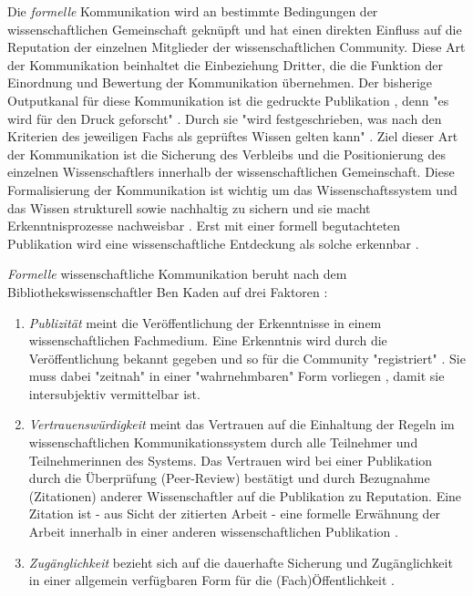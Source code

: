 Die \textit{formelle} Kommunikation wird an bestimmte Bedingungen der wissenschaftlichen Gemeinschaft geknüpft und hat einen direkten Einfluss auf die Reputation der einzelnen Mitglieder der wissenschaftlichen Community. Diese Art der Kommunikation beinhaltet die Einbeziehung Dritter, die die Funktion der Einordnung und Bewertung der Kommunikation übernehmen. Der bisherige Outputkanal für diese Kommunikation ist die gedruckte Publikation \cite{winkler_2011_anforderungen}, denn "es wird für den Druck geforscht" \cite{luhmann_1997_gesellschaft}. Durch sie "wird festgeschrieben, was nach den Kriterien des jeweiligen Fachs als geprüftes Wissen gelten kann" \cite{bbaw_publizieren_2015}. Ziel dieser Art der Kommunikation ist die Sicherung des Verbleibs und die Positionierung des einzelnen Wissenschaftlers innerhalb der wissenschaftlichen Gemeinschaft. Diese Formalisierung der Kommunikation ist wichtig um das Wissenschaftssystem und das Wissen strukturell sowie nachhaltig zu sichern und sie macht Erkenntnisprozesse nachweisbar \cite{kaden_2009_library}. Erst mit einer formell begutachteten Publikation wird eine wissenschaftliche Entdeckung als solche erkennbar \cite{brembs2015open}.

\textit{Formelle} wissenschaftliche Kommunikation beruht nach dem Bibliothekswissenschaftler Ben Kaden auf drei Faktoren \cite{kaden_2009_library}:
\begin{enumerate}
\item \textit{Publizität} meint die Veröffentlichung der Erkenntnisse in einem wissenschaftlichen Fachmedium. Eine Erkenntnis wird durch die Veröffentlichung bekannt gegeben und so für die Community "registriert" \cite{kaden_2009_library}. Sie muss dabei "zeitnah" in einer "wahrnehmbaren" Form vorliegen \cite{Schimank_2012}, damit sie intersubjektiv vermittelbar ist.
\item \textit{Vertrauenswürdigkeit} meint das Vertrauen auf die Einhaltung der Regeln \cite{suchen} im wissenschaftlichen Kommunikationssystem durch alle Teilnehmer und Teilnehmerinnen des Systems. Das Vertrauen wird bei einer Publikation durch die Überprüfung (Peer-Review) bestätigt und durch Bezugnahme (Zitationen) anderer Wissenschaftler auf die Publikation zu Reputation. Eine Zitation ist - aus Sicht der zitierten Arbeit - eine formelle Erwähnung der Arbeit innerhalb in einer anderen wissenschaftlichen Publikation \cite{weller2011twitter}.
\item \textit{Zugänglichkeit} bezieht sich auf die dauerhafte Sicherung und Zugänglichkeit in einer allgemein verfügbaren Form für die (Fach)Öffentlichkeit \cite{naeder_2010_open}.
\end{enumerate}

